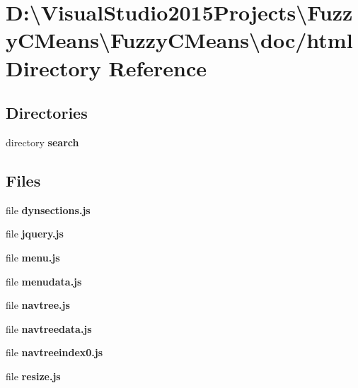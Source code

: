 \section{D\+:\textbackslash{}Visual\+Studio2015\+Projects\textbackslash{}Fuzzy\+C\+Means\textbackslash{}Fuzzy\+C\+Means\textbackslash{}doc/html Directory Reference}
\label{dir_588c012487e5f2c4f2b4f49660fb7166}
\subsection*{Directories}
\begin{DoxyCompactItemize}
\item 
directory \textbf{ search}
\end{DoxyCompactItemize}
\subsection*{Files}
\begin{DoxyCompactItemize}
\item 
file \textbf{ dynsections.\+js}
\item 
file \textbf{ jquery.\+js}
\item 
file \textbf{ menu.\+js}
\item 
file \textbf{ menudata.\+js}
\item 
file \textbf{ navtree.\+js}
\item 
file \textbf{ navtreedata.\+js}
\item 
file \textbf{ navtreeindex0.\+js}
\item 
file \textbf{ resize.\+js}
\end{DoxyCompactItemize}
